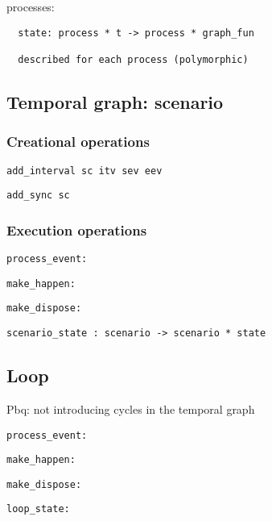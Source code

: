 \documentclass[applsci,article,submit,moreauthors,pdftex,10pt,a4paper]{mdpi}
\begin{document}
processes:
\begin{lstlisting}
  state: process * t -> process * graph_fun
  
  described for each process (polymorphic)
\end{lstlisting}

\subsection{Temporal graph: scenario}


\subsubsection{Creational operations}

\begin{lstlisting}
add_interval sc itv sev eev
\end{lstlisting}
\begin{lstlisting}
add_sync sc
\end{lstlisting}
\subsubsection{Execution operations}

\begin{lstlisting}
process_event:
\end{lstlisting}
\begin{lstlisting}
make_happen:
\end{lstlisting}
\begin{lstlisting}
make_dispose:
\end{lstlisting}

\begin{lstlisting}
scenario_state : scenario -> scenario * state
\end{lstlisting}

\subsection{Loop}
Pbq: not introducing cycles in the temporal graph
\begin{lstlisting}
process_event:
\end{lstlisting}
\begin{lstlisting}
make_happen:
\end{lstlisting}
\begin{lstlisting}
make_dispose:
\end{lstlisting}
\begin{lstlisting}
loop_state:
\end{lstlisting}
\end{document}

